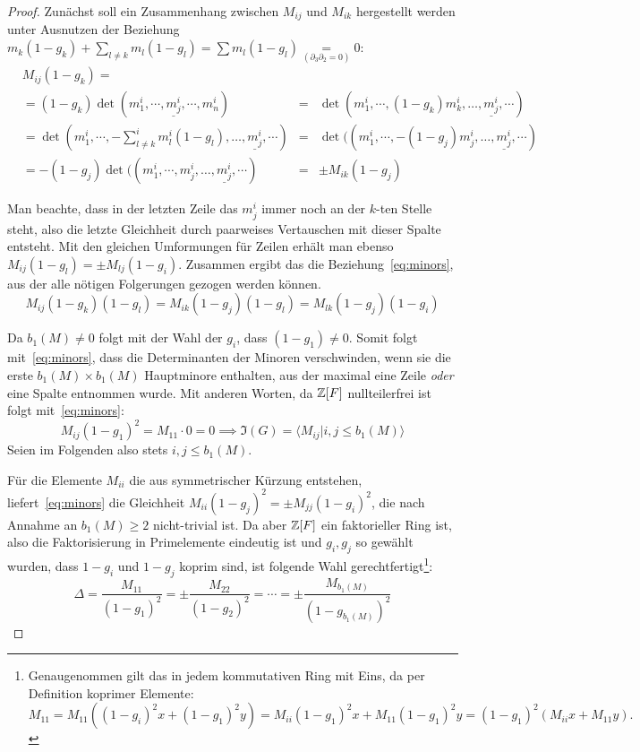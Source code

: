 \begin{proof}
	Zunächst soll ein Zusammenhang zwischen $M_{ij}$ und $M_{ik}$ hergestellt werden unter Ausnutzen der Beziehung $m_k(1-g_k)+\sum_{l \neq k}m_l(1-g_l)= \sum m_l(1-g_l) \underset{(\partial_3  \partial_2=0)} =0$:
	\begin{align*}
	&M_{ij}(1-g_k)=\\
	&	=(1-g_k)\det(m^i_1,\cdots,\underline {m^i_j},\cdots,m^i_n)&=& \det(m^i_1,\cdots,(1-g_k)m^i_k,\dots,\underline {m^i_j},\cdots)\\
	&				 =\det(m^i_1,\cdots,-\sum^i_{l \neq k}m^i_l(1-g_l),\dots,\underline {m^i_j},\cdots) &=&\det((m^i_1,\cdots,-(1-g_j)m^i_j,\dots,\underline {m^i_j},\cdots)\\
	&				 =-(1-g_j)\det((m^i_1,\cdots,m^i_j,\dots,\underline {m^i_j},\cdots) &=& \pm M_{ik}(1-g_j)
	\end{align*}

	Man beachte, dass in der letzten Zeile das $m_j^i$ immer noch an der $k$-ten Stelle steht, also die letzte Gleichheit durch paarweises Vertauschen mit dieser Spalte entsteht. Mit den gleichen Umformungen für Zeilen erhält man ebenso $M_{ij}(1-g_l)=\pm M_{lj}(1-g_i)$. Zusammen ergibt das die Beziehung~\eqref{eq:minors}, aus der alle nötigen Folgerungen gezogen werden können.
	\begin{equation}
		M_{ij}(1-g_k)(1-g_l)=M_{ik}(1-g_j)(1-g_l)=M_{lk}(1-g_j)(1-g_i) \label{eq:minors}
	\end{equation}

	Da $b_1(M)\neq 0$ folgt mit der Wahl der $g_i$, dass $(1-g_1)\neq 0$. Somit folgt mit~\eqref{eq:minors}, dass die Determinanten der Minoren verschwinden, wenn sie die erste $b_1(M)\times b_1(M)$ Hauptminore enthalten, aus der maximal eine Zeile \emph{oder} eine Spalte entnommen wurde. Mit anderen Worten, da $\mathbb{Z}[F]$ nullteilerfrei ist folgt mit~\eqref{eq:minors}:
	\[
		M_{ij}(1-g_1)^2 = M_{11}\cdot0=0 \implies \mathfrak I(G)= \langle M_{ij}|i,j \leq b_1(M) \rangle
	\]
	Seien im Folgenden also stets $i,j\leq b_1(M)$.

	Für die Elemente $M_{ii}$ die aus symmetrischer Kürzung entstehen, liefert~\eqref{eq:minors} die Gleichheit $M_{ii}(1-g_j)^2=\pm M_{jj}(1-g_i)^2$, die nach Annahme an $b_1(M)\geq 2$ nicht-trivial ist. Da aber $\mathbb{Z}[F]$ ein faktorieller Ring ist, also die Faktorisierung in Primelemente eindeutig ist und $g_i,g_j$ so gewählt wurden, dass $1-g_i$ und $1-g_j$ koprim sind, ist folgende Wahl gerechtfertigt\footnote{Genaugenommen gilt das in jedem kommutativen Ring mit Eins, da per Definition koprimer Elemente: $M_{11}=M_{11}((1-g_i)^2x +(1-g_1)^2 y)= M_{ii}(1-g_1)^2x + M_{11}(1-g_1)^2y =(1-g_1)^2 (M_{ii}x+ M_{11} y).$}:
	\[
		\Delta = \frac{M_{11}}{(1-g_1)^2} = \pm \frac{M_{22}}{(1-g_2)^2} = \cdots = \pm \frac{M_{b_1(M)}}{(1-g_{b_1(M)})^2}
	\]


\end{proof}
